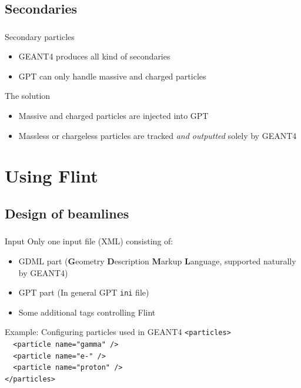 \documentclass{beamer}
\newcommand{\ident}{\thesection.\thesubsection}
\newcommand{\mysubsection}[1]{\subsection{#1}\label{\ident}}
\newcommand{\ftitle}{\frametitle{\nameref{\ident}}}
\newcommand{\geant}{G{\smaller EANT}4 }
\newcommand{\geantws}{G{\smaller EANT}4}
\begin{document}
\mysubsection{Secondaries}

\begin{frame}
	\ftitle
	\begin{block}{Secondary particles}
		\begin{itemize}
		 \item \geant produces all kind of secondaries
		 \item GPT can only handle massive and charged particles
		\end{itemize}
	\end{block}
	\pause
	\begin{exampleblock}{The solution}
		\begin{itemize}
			\item Massive and charged particles are injected into GPT
			\item Massless or chargeless particles are tracked \emph{and outputted} solely by \geant
		\end{itemize}
	\end{exampleblock}
\end{frame}

\section{Using Flint}

\mysubsection{Design of beamlines}

\begin{frame}
	\ftitle
	\begin{block}{Input}
		Only one input file (XML) consisting of:
		\begin{itemize}
			\item GDML part (\textbf{G}eometry \textbf{D}escription \textbf{M}arkup \textbf{L}anguage, supported naturally by \geantws)
			\item GPT part (In general GPT \texttt{ini} file)
			\item Some additional tags controlling Flint
		\end{itemize}
	\end{block}
	\pause
	\begin{exampleblock}{Example: Configuring particles used in \geant}
		\texttt{<particles>\\
			~~<particle name="gamma" />\\
			~~<particle name="e-" />\\
			~~<particle name="proton" />\\
			</particles>
		}
	\end{exampleblock}
\end{frame}
\end{document}
